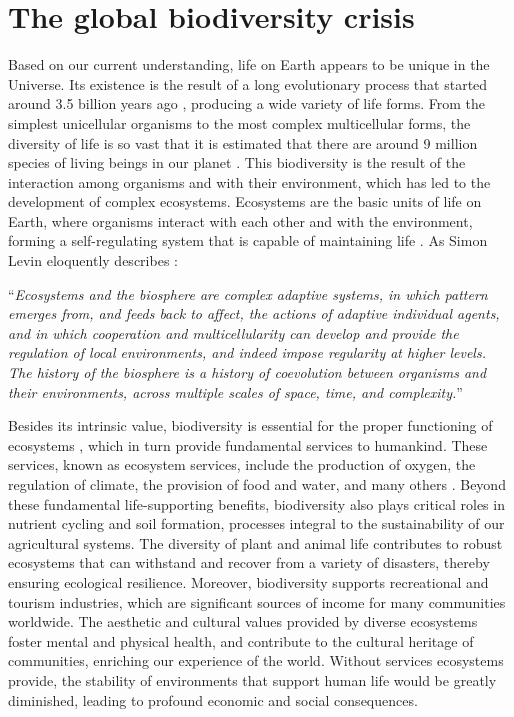 \setcounter{page}{1}

\section{\label{sec:The global biodiversity crisis} The global biodiversity
  crisis}

Based on our current understanding, life on Earth appears to be unique in the
Universe. Its existence is the result of a long evolutionary process that
started around 3.5 billion years ago \cite{Taylor_1993,Schopf2006},
producing a wide variety of life forms. From the simplest unicellular organisms
to the most complex multicellular forms, the diversity of life is so vast that
it is estimated that there are around 9 million species of living beings in our
planet \cite{Cardinale2012}. This biodiversity is the result of the interaction
among organisms and with their environment, which has led to the development of
complex ecosystems. Ecosystems are the basic units of life on Earth, where
organisms interact with each other and with the environment, forming a
self-regulating system that is capable of maintaining life \cite{Levin2005}.
As Simon Levin eloquently describes \cite{Levin2005}:

\begin{displayquote}
  ``\textit{Ecosystems and the biosphere are complex adaptive systems, in which
    pattern
    emerges from, and feeds back to affect, the actions of adaptive individual
    agents, and in which cooperation and multicellularity can develop and
    provide
    the regulation of local environments, and indeed impose regularity at
    higher
    levels. The history of the biosphere is a history of coevolution between
    organisms and their environments, across multiple scales of space, time,
    and
    complexity.}''
\end{displayquote}

Besides its intrinsic value, biodiversity is essential for the proper
functioning of ecosystems \cite{Gamfeldt2008}, which in turn provide
fundamental services to humankind. These services, known as ecosystem services,
include the production of oxygen, the regulation of climate, the provision
of food and water, and many others \cite{Daily1997}. Beyond these fundamental
life-supporting benefits, biodiversity also plays critical roles in nutrient
cycling and soil formation, processes integral to the sustainability of our
agricultural systems. The diversity of plant and animal life contributes to
robust ecosystems that can withstand and recover from a variety of disasters,
thereby ensuring ecological resilience. Moreover, biodiversity supports
recreational and tourism industries, which are significant sources of income
for many communities worldwide. The aesthetic and cultural values provided by
diverse ecosystems foster mental and physical health, and contribute to the
cultural heritage of communities, enriching our experience of the world.
Without services ecosystems provide, the stability of environments that support
human life would be greatly diminished, leading to profound economic and social
consequences.

